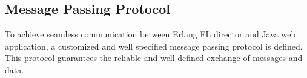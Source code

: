 \subsection{Message Passing Protocol}
To achieve seamless communication between Erlang FL director and Java web application, a customized and well specified message passing protocol is defined. This protocol guarantees the reliable and well-defined exchange of messages and data.












